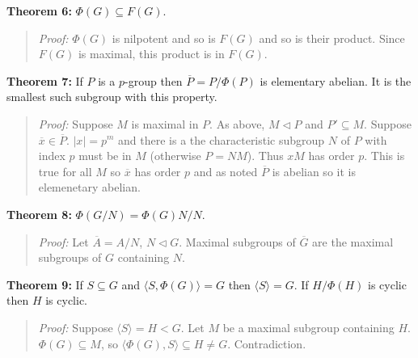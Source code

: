 {\bf Theorem 6:} $\Phi(G) \subseteq F(G)$.
\begin{quote}
\emph{Proof:} $\Phi(G)$ is nilpotent and so is $F(G)$ and so is their product.  Since
$F(G)$ is maximal, this product is in $F(G)$.
\end{quote}
{\bf Theorem 7:} If $P$ is a $p$-group then ${\overline P}= P/\Phi(P)$ is elementary abelian.  It
is the smallest such subgroup with this property.
\begin{quote}
\emph{Proof:}  Suppose $M$ is maximal in $P$.  As above, $M \lhd P$ and $P' \subseteq M$.
Suppose ${\overline x} \in {\overline P}$.  $|x|= p^m$ and there is a the characteristic
subgroup $N$ of $P$ with index $p$ must be in $M$ (otherwise $P=NM$).  
Thus $xM$ has order $p$.  This is
true for all $M$ so ${\overline x}$ has order $p$ and as noted ${\overline P}$ is abelian so
it is elemenetary abelian.
\end{quote}
{\bf Theorem 8:} $\Phi(G/N)= \Phi(G)N/N$.
\begin{quote}
\emph{Proof:} Let ${\overline A}= A/N$, $N \lhd G$.  Maximal subgroups of ${\overline G}$ are
the maximal subgroups of $G$ containing $N$.
\end{quote}
{\bf Theorem 9:} If $S \subseteq G$ and $ \langle S, \Phi(G) \rangle =G$ then $ \langle S \rangle
=G$.  If $H/\Phi(H)$ is cyclic then $H$ is cyclic.
\begin{quote}
\emph{Proof:}  Suppose $ \langle S \rangle
=H < G$. Let  $M$ be a maximal subgroup containing $H$.  
$\Phi(G) \subseteq M$, so $ \langle \Phi(G), S \rangle \subseteq H \ne G$.  Contradiction.
\end{quote}
